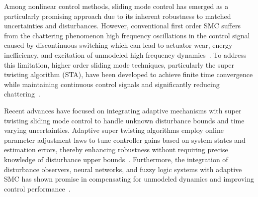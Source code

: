 





\noindent Among nonlinear control methods, sliding mode control has emerged as a particularly promising approach due to its inherent robustness to matched uncertainties and disturbances. However, conventional first order SMC suffers from the chattering phenomenon high frequency oscillations in the control signal caused by discontinuous switching which can lead to actuator wear, energy inefficiency, and excitation of unmodeled high frequency dynamics~\cite{anderson2020constrained,mofid2020adaptive}. To address this limitation, higher order sliding mode techniques, particularly the super twisting algorithm (STA), have been developed to achieve finite time convergence while maintaining continuous control signals and significantly reducing chattering~\cite{abera2024improved,kashi2025finite}.

\noindent Recent advances have focused on integrating adaptive mechanisms with super twisting sliding mode control to handle unknown disturbance bounds and time varying uncertainties. Adaptive super twisting algorithms employ online parameter adjustment laws to tune controller gains based on system states and estimation errors, thereby enhancing robustness without requiring precise knowledge of disturbance upper bounds~\cite{fatemi2025adaptive,sang2024quadrotor}. Furthermore, the integration of disturbance observers, neural networks, and fuzzy logic systems with adaptive SMC has shown promise in compensating for unmodeled dynamics and improving control performance~\cite{ahmed2022adaptive,shevidi2024adaptive}.

